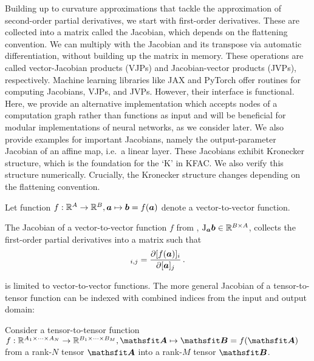 Building up to curvature approximations that tackle the approximation of second-order partial derivatives, we start with first-order derivatives.
These are collected into a matrix called the Jacobian, which depends on the flattening convention.
We can multiply with the Jacobian and its transpose via automatic differentiation, without building up the matrix in memory.
These operations are called vector-Jacobian products (VJPs) and Jacobian-vector products (JVPs), respectively.
Machine learning libraries like JAX and PyTorch offer routines for computing Jacobians, VJPs, and JVPs.
However, their interface is functional.
Here, we provide an alternative implementation which accepts nodes of a computation graph rather than functions as input and will be beneficial for modular implementations of neural networks, as we consider later.
We also provide examples for important Jacobians, namely the output-parameter Jacobian of an affine map, i.e.\, a linear layer.
These Jacobians exhibit Kronecker structure, which is the foundation for the `K' in KFAC.
We also verify this structure numerically.
Crucially, the Kronecker structure changes depending on the flattening convention.

\begin{setup}\label{setup:vector_to_vector_function}
  Let function $f: {\mathbb{R}}^A \to {\mathbb{R}}^B, {\bm{a}} \mapsto {\bm{b}} = f({\bm{a}})$ denote a vector-to-vector function.
\end{setup}

\begin{definition}\label{def:vector_jacobian}
  The Jacobian of a vector-to-vector function $f$ from , $\mathrm{J}_{{\bm{a}}}{\bm{b}} \in {\mathbb{R}}^{B \times A}$, collects the first-order partial derivatives into a matrix such that
  \begin{align*}
    [\jac_{\va} \vb]_{i,j} = \frac{\partial [f(\va)]_i}{\partial [\va]_j}\,.
  \end{align*}
\end{definition}
 is limited to vector-to-vector functions.
The more general Jacobian of a tensor-to-tensor function can be indexed with combined indices from the input and output domain:

\begin{setup}\label{setup:jacobians}
  Consider a tensor-to-tensor function $f: \sR^{A_1 \times \dots \times A_N} \to \sR^{B_1 \times \dots \times B_M}, \tA \mapsto \tB = f(\tA)$ from a rank-$N$ tensor $\tA$ into a rank-$M$ tensor $\tB$.
\end{setup}

